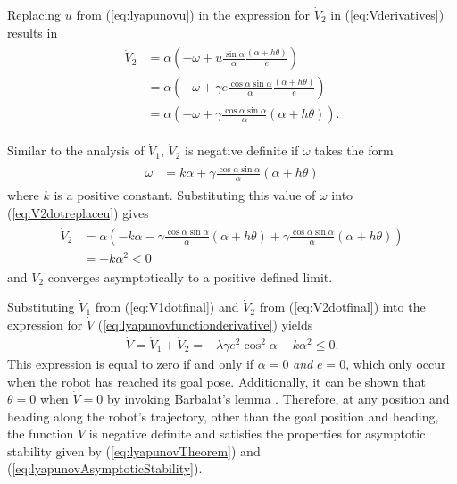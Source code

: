 Replacing $u$ from (\ref{eq:lyapunovu}) in the expression for $\dot{V}_2$ in (\ref{eq:Vderivatives}) results in
\begin{align}
\label{eq:V2dotreplaceu}
\begin{split}
\dot{V}_2 &= \alpha\left(-\omega+u\frac{\sin\alpha}{\alpha}\frac{(\alpha+h\theta)}{e}\right) \\
&= \alpha\left(-\omega+\gamma e\frac{\cos\alpha\sin\alpha}{\alpha}\frac{(\alpha+h\theta)}{e}\right) \\
&= \alpha\left(-\omega+\gamma\frac{\cos\alpha\sin\alpha}{\alpha}(\alpha+h\theta)\right).
\end{split}
\end{align}

Similar to the analysis of $\dot{V}_1$, $\dot{V}_2$ is negative definite if $\omega$ takes the form
\begin{align}
\label{eq:lyapunovomega}
\begin{split}
\omega &= k\alpha + \gamma\frac{\cos\alpha\sin\alpha}{\alpha}\left(\alpha+h\theta\right)
\end{split}
\end{align}
where $k$ is a positive constant. Substituting this value of $\omega$ into (\ref{eq:V2dotreplaceu}) gives
\begin{align}
\label{eq:V2dotfinal}
\begin{split}
\dot{V}_2 &= \alpha\left(-k\alpha-\gamma\frac{\cos\alpha\sin\alpha}{\alpha}(\alpha+h\theta) + \gamma\frac{\cos\alpha\sin\alpha}{\alpha}(\alpha+h\theta)\right) \\
&= -k\alpha^2 < 0
\end{split}
\end{align}
and $V_2$ converges asymptotically to a positive defined limit.

Substituting $\dot{V}_1$ from (\ref{eq:V1dotfinal}) and $\dot{V}_2$ from (\ref{eq:V2dotfinal}) into the expression for $\dot{V}$ (\ref{eq:lyapunovfunctionderivative}) yields
\begin{align*}
\dot{V} = \dot{V}_1 + \dot{V}_2 = -\lambda\gamma e^2\cos^2\alpha - k\alpha^2 \leq 0.
\end{align*}
This expression is equal to zero if and only if $\alpha=0$ \textit{and} $e=0$, which only occur when the robot has reached its goal pose. Additionally, it can be shown that $\theta=0$ when $\dot{V}=0$ by invoking Barbalat's lemma \cite{Aicardi_UnicycleLyapunov95}. Therefore, at any position and heading along the robot's trajectory, other than the goal position and heading, the function $\dot{V}$ is negative definite and satisfies the properties for asymptotic stability given by (\ref{eq:lyapunovTheorem}) and (\ref{eq:lyapunovAsymptoticStability}).

